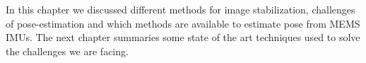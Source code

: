 

In this chapter we discussed different methods for image stabilization, challenges of pose-estimation  and which methods are available to estimate pose from MEMS IMUs. The next chapter summaries some state of the art techniques used to solve the challenges we are facing.
